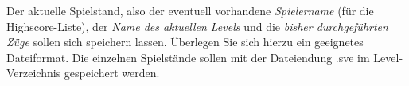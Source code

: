 Der aktuelle Spielstand, also der eventuell vorhandene
\emph{Spielername} (f\"ur die Highscore-Liste), der \emph{Name des
  aktuellen Levels} und die \emph{bisher durchgef\"uhrten Z\"uge} sollen
sich speichern lassen. \"Uberlegen Sie sich hierzu ein geeignetes
Dateiformat. Die einzelnen Spielst\"ande sollen mit der Dateiendung
\glqq{}.sve\grqq{} im Level-Verzeichnis gespeichert werden.

\fileFormatDescription
